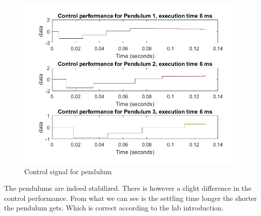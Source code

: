 \documentclass[12pt,a4paper]{article}
\begin{document}
    \begin{center}
      \begin{figure}
        \includegraphics[scale=0.5]{ex32.png}
      \caption{Control signal for pendulum}
      \end{figure}
    \end{center}

    The pendulums are indeed stabilized. There is however a slight difference
    in the control performance. From what we can see is the settling
    time longer the shorter the pendulum gets. Which is correct
    according to the lab introduction. 
\end{document}
